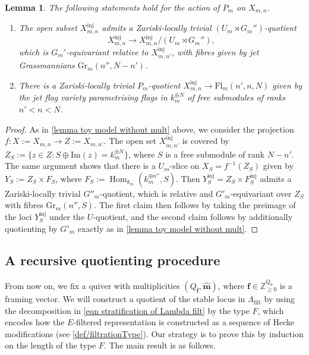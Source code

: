 \documentclass[a4paper,12pt]{article}
\theoremstyle{definition}
\theoremstyle{plain}
\newtheorem{lemma}[definition]{Lemma}
\theoremstyle{remark}
\DeclareMathOperator{\Hom}{Hom}
\newcommand\bbZ{\mathbb{Z}}
\newcommand\bff{\mathbf{f}}
\newcommand\bfm{\mathbf{m}}
\begin{document}
\begin{lemma}\label{Lem/toyJetParabolicQuotient}
The following statements hold for the action of $P_m$ on $X_{m,n}$.
\begin{enumerate}[label=\emph{\roman*})]
\item The open subset $X_{m,n}^{\mathrm{inj}}$ admits a Zariski-locally trivial $(U_m \rtimes G_m'')$-quotient
\[ X_{m,n}^{\mathrm{inj}} \rightarrow X_{m,n}^{\mathrm{inj}}/ (U_m \rtimes G_m''), \]
which is $G_m'$-equivariant relative to $X_{m,n'}^{\mathrm{inj}}$, with fibres given by jet Grassmannians $\mathrm{Gr}_m(n'',N-n')$.
\item There is a Zariski-locally trivial $P_m$-quotient  $X_{m,n}^{\mathrm{inj}} \rightarrow \mathrm{Fl}_m(n',n,N)$  given by the jet flag variety parametrising flags in $k_m^{\oplus N}$ of free submodules of ranks $n' < n < N$.
\end{enumerate}
\end{lemma}
\begin{proof}
As in \cref{lemma toy model without mult} above, we consider the projection $f \colon X:=X_{m,n} \rightarrow Z:=X_{m,n'}$. The open set $X_{m,n'}^{\mathrm{inj}}$ is covered by $Z_S := \{ z \in Z \colon S \oplus \mathrm{Im}(z) = k_m^{\oplus N}\}$, 
where $S$ is a free submodule of rank $N-n'$. The same argument shows that there is a $U_m$-slice on $X_S=f^{-1}(Z_S)$ given by $Y_S := Z_S \times F_S$, where $F_S:= \Hom_{k_m}(k_m^{\oplus n''},S)$. Then $Y_S^{\mathrm{inj}} = Z_S \times F_S^{\mathrm{inj}}$ admits a Zariski-locally trivial $G''_m$-quotient, which is relative and $G'_m$-equivariant over $Z_S$ with fibres $\mathrm{Gr}_m(n'',S)$. The first claim then follows by taking the preimage of the loci $Y_S^{\mathrm{inj}}$ under the $U$-quotient, and the second claim follows by additionally quotienting by $G'_m$ exactly as in \cref{lemma toy model without mult}.
\end{proof}


\subsection{A recursive quotienting procedure}\label{Sect/RecursiveQuotient}

From now on, we fix a quiver with multiplicities $(Q_\bff,\widehat{\bfm})$, where $\bff\in\bbZ_{\geq0}^{Q_0}$ is a framing vector. We will construct a quotient of the stable locus in $\Lambda_{\mathrm{filt}}$ by using the decomposition in \cref{eqn stratification of Lambda filt} by the type $F$, which encodes how the $E$-filtered representation is constructed as a sequence of Hecke modifications (see \cref{def/filtrationType}). Our strategy is to prove this by induction on the length of the type $F$. The main result is as follows.
\end{document}
